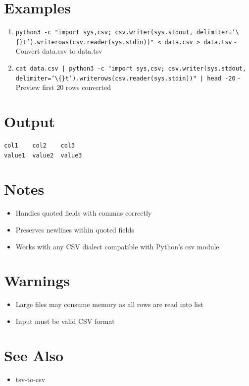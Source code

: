 \documentclass{article}
\begin{document}
\section*{Examples}
\begin{enumerate}
  \item \texttt{python3 -c "import sys,csv; csv.writer(sys.stdout, delimiter='\textbackslash\{\}t').writerows(csv.reader(sys.stdin))" < data.csv > data.tsv} - Convert data.csv to data.tsv
  \item \texttt{cat data.csv | python3 -c "import sys,csv; csv.writer(sys.stdout, delimiter='\textbackslash\{\}t').writerows(csv.reader(sys.stdin))" | head -20} - Preview first 20 rows converted
\end{enumerate}

\section*{Output}
\begin{lstlisting}
col1	col2	col3
value1	value2	value3

\end{lstlisting}

\section*{Notes}
\begin{itemize}
  \item Handles quoted fields with commas correctly
  \item Preserves newlines within quoted fields
  \item Works with any CSV dialect compatible with Python's csv module
\end{itemize}

\section*{Warnings}
\begin{itemize}
  \item Large files may consume memory as all rows are read into list
  \item Input must be valid CSV format
\end{itemize}

\section*{See Also}
\begin{itemize}
  \item tsv-to-csv
\end{itemize}
\end{document}
